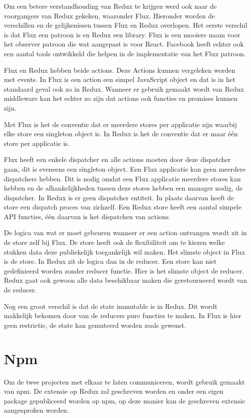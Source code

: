 Om een betere verstandhouding van Redux te krijgen werd ook naar de voorgangers van Redux gekeken, waaronder Flux. Hieronder worden de verschillen en de gelijkenissen tussen Flux en Redux overlopen. 
Het eerste verschil is dat Flux een patroon is en Redux een library. Flux is een mooiere naam voor het observer patroon die wat aangepast is voor React. Facebook heeft echter ook een aantal tools ontwikkeld die helpen in de implementatie van het Flux patroon. 

Flux en Redux hebben beide actions. Deze Actions kunnen vergeleken worden met events. In Flux is een action een simpel JavaScript object en dat is in het standaard geval ook zo in Redux. Wanneer er gebruik gemaakt wordt van Redux middleware kan het echter zo zijn dat actions ook functies en promises kunnen zijn. 

Met Flux is het de conventie dat er meerdere stores per applicatie zijn waarbij elke store een singleton object is. In Redux is het de conventie dat er maar één store per applicatie is. 

Flux heeft een enkele dispatcher en alle actions moeten door deze dispatcher gaan, dit is eveneens een singleton object. Een Flux applicatie kan geen meerdere dispatchers hebben. Dit is nodig omdat een Flux applicatie meerdere stores kan hebben en de afhankelijkheden tussen deze stores hebben een manager nodig, de dispatcher. In Redux is er geen dispatcher entiteit. In plaats daarvan heeft de store een dispatch proces van zichzelf. Een Redux store heeft een aantal simpele API functies, één daarvan is het dispatchen van actions.

De logica van wat er moet gebeuren wanneer er een action ontvangen wordt zit in de store zelf bij Flux. De store heeft ook de flexibiliteit om te kiezen welke stukken data deze publiekelijk toegankelijk wil maken. Het slimste object in Flux is de store. In Redux zit de logica dan in de reducer. Een store kan niet gedefinieerd worden zonder reducer functie. Hier is het slimste object de reducer. Redux gaat ook gewoon alle data beschikbaar maken die geretourneerd wordt van de reducer. 

Nog een groot verschil is dat de state immutable is in Redux. Dit wordt makkelijk bekomen door van de reducers pure functies te maken. In Flux is hier geen restrictie, de state kan gemuteerd worden zoals gewenst.
\autocite{flux}

\section{Npm}
Om de twee projecten met elkaar te laten communiceren, wordt gebruik gemaakt van npm. De extensie op Redux zal geschreven worden en onder een eigen package gepubliceerd worden op npm, op deze manier kan de geschreven extensie aangesproken worden. 

